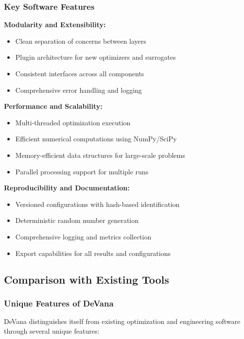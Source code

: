 \documentclass[12pt,a4paper]{article}
\newcommand{\softwareName}{DeVana}
\begin{document}
\subsubsection{Key Software Features}

\textbf{Modularity and Extensibility:}
\begin{itemize}
    \item Clean separation of concerns between layers
    \item Plugin architecture for new optimizers and surrogates
    \item Consistent interfaces across all components
    \item Comprehensive error handling and logging
\end{itemize}

\textbf{Performance and Scalability:}
\begin{itemize}
    \item Multi-threaded optimization execution
    \item Efficient numerical computations using NumPy/SciPy
    \item Memory-efficient data structures for large-scale problems
    \item Parallel processing support for multiple runs
\end{itemize}

\textbf{Reproducibility and Documentation:}
\begin{itemize}
    \item Versioned configurations with hash-based identification
    \item Deterministic random number generation
    \item Comprehensive logging and metrics collection
    \item Export capabilities for all results and configurations
\end{itemize}

\subsection{Comparison with Existing Tools}

\subsubsection{Unique Features of DeVana}

\softwareName{} distinguishes itself from existing optimization and engineering software through several unique features:
\end{document}
